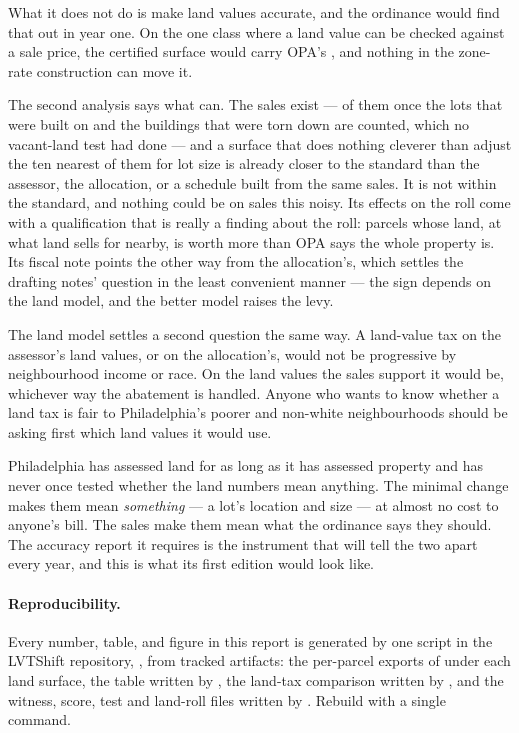 \documentclass[11pt]{article}
\begin{document}
What it does not do is make land values accurate, and the ordinance would find that out in
year one. On the one class where a land value can be checked against a sale price, the
certified surface would carry OPA's \LycdSalesOPAAgg{}, and nothing in the zone-rate
construction can move it.

The second analysis says what can. The sales exist --- \LycdWitN{} of them once the lots that
were built on and the buildings that were torn down are counted, which no vacant-land test
had done --- and a surface that does nothing cleverer than adjust the ten nearest of them for
lot size is already closer to the standard than the assessor, the allocation, or a schedule
built from the same sales. It is not within the standard, and nothing could be on sales this
noisy. Its effects on the roll come with a qualification that is really a finding about the
roll: \LycdSfivePreCapExceedsCore{} parcels whose land, at what land sells for nearby, is worth
more than OPA says the whole property is. Its fiscal note points the other way from the
allocation's, which settles the drafting notes' question in the least convenient manner --- the
sign depends on the land model, and the better model raises the levy.

The land model settles a second question the same way. A land-value tax on the assessor's land
values, or on the allocation's, would not be progressive by neighbourhood income or race. On
the land values the sales support it would be, whichever way the abatement is handled. Anyone
who wants to know whether a land tax is fair to Philadelphia's poorer and non-white
neighbourhoods should be asking first which land values it would use.

Philadelphia has assessed land for as long as it has assessed property and has never once
tested whether the land numbers mean anything. The minimal change makes them mean
\emph{something} --- a lot's location and size --- at almost no cost to anyone's bill. The
sales make them mean what the ordinance says they should. The accuracy report it requires is
the instrument that will tell the two apart every year, and this is what its first edition
would look like.

\paragraph{Reproducibility.} Every number, table, and figure in this report is generated by
one script in the LVTShift repository, , from
tracked artifacts: the per-parcel exports of
 under each land surface, the table
written by , the land-tax comparison written by
, and the witness, score, test and
land-roll files written by .
Rebuild with a single command.
\end{document}
